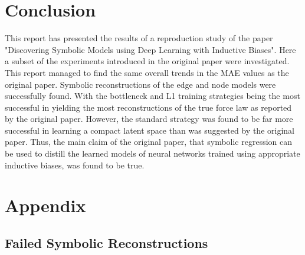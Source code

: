 \documentclass[11pt]{article}
\begin{document}


\section{Conclusion}
This report has presented the results of a reproduction study of the paper "Discovering Symbolic Models using Deep Learning with Inductive Biases". Here a subset of the experiments introduced in the original paper were investigated. This report managed to find the same overall trends in the MAE values as the original paper. Symbolic reconstructions of the edge and node models were successfully found. With the bottleneck and L1 training strategies being the most successful in yielding the most reconstructions of the true force law as reported by the original paper. However, the standard strategy was found to be far more successful in learning a compact latent space than was suggested by the original paper. Thus, the main claim of the original paper, that symbolic regression can be used to distill the learned models of neural networks trained using appropriate inductive biases, was found to be true.

\section{Appendix}
\subsection{Failed Symbolic Reconstructions}
\end{document}
